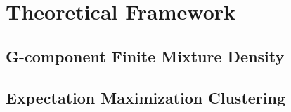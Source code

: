 \chapter{Theoretical Framework}
\label{sec:theoreticalframework} 

\section{G-component Finite Mixture Density}
\label{sec:gcomponentmixturedensity}

\section{Expectation Maximization Clustering}
\label{sec:modelbasedclustering}

